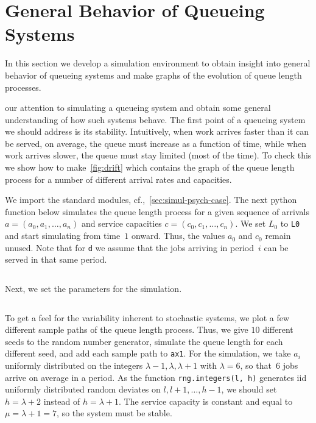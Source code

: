 \documentclass[queueing-book.tex]{subfiles}
\begin{document}
\section{General Behavior of Queueing Systems}
\label{sec:simul-discr-time}


In this section we develop a simulation environment to obtain insight into general behavior of queueing systems and make graphs of the evolution of queue length processes.


 our attention to simulating a queueing system and obtain some general understanding of how such systems behave.
The first point of a queueing system we should address is its stability.
Intuitively, when work arrives faster than it can be served, on average, the queue must increase as a function of time, while when work arrives slower, the queue must stay limited (most of the time).
To check this we show how to make~\cref{fig:drift} which contains the graph of the queue length process for a number of different arrival rates and capacities.




We import the standard modules, cf.,~\cref{sec:simul-psych-case}.
The next python function below simulates the queue length process for a given sequence of arrivals $a=(a_{0}, a_{1}, \ldots, a_{n})$ and service capacities $c = (c_{0}, c_{1}, \ldots, c_{n})$.
We set $L_{0}$ to \texttt{L0} and start simulating from time~$1$ onward.
Thus, the values $a_{0}$ and $c_{0}$ remain unused.
Note that for \texttt{d} we assume that the jobs arriving in period~$i$ can be served in that same period.
\inputminted[firstline=26, lastline=34]{python}{../code/discrete_simulations.py} %

Next, we set the parameters for the simulation.
\inputminted[firstline=40, lastline=43]{python}{../code/discrete_simulations.py} %

To get a feel for the variability inherent to stochastic systems, we plot a few different sample paths of the queue length process.
Thus, we give $10$ different seeds to the random number generator, simulate the queue length for each different seed, and add each sample path to \texttt{ax1}.
For the simulation, we take $a_{i}$ uniformly distributed on the integers $\lambda-1, \lambda, \lambda +1$ with $\lambda=6$, so that~$6$ jobs arrive on average in a period.
As the function \texttt{rng.integers(l, h)} generates iid uniformly distributed random deviates on $l, l+1, \ldots, h-1$, we should set $h=\lambda + 2$ instead of $h=\lambda +1$.
The service capacity is constant and equal to $\mu=\lambda + 1 =7$, so the system must be stable.
\inputminted[firstline=47, lastline=57]{python}{../code/discrete_simulations.py} %
\end{document}
